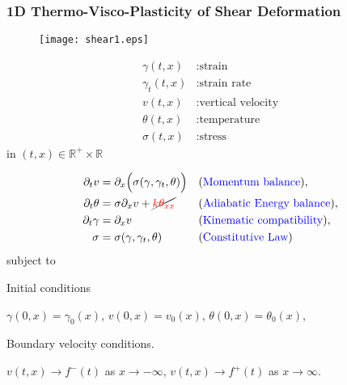 \documentclass{beamer}
\def\red{\color{red}}
\def\blue{\color{blue}}
\begin{document}
\begin{frame}
\frametitle{1D Thermo-Visco-Plasticity of Shear Deformation}
    \begin{minipage}{0.31\linewidth}
    \begin{figure}
    \centering
    \texttt{[image: shear1.eps]}
    \end{figure}
      {\scriptsize
    \begin{equation*} %
    \begin{aligned}
    \gamma(t,x) &: \text{strain}\\
    \gamma_t(t,x) &: \text{strain rate}\\
    v(t,x) &: \text{vertical velocity}\\
    \theta(t,x) &: \text{temperature}\\
    \sigma(t,x) &: \text{stress}
    \end{aligned}
    \end{equation*}
    in $(t,x)\in \mathbb{R}^+ \times \mathbb{R}$}
    \end{minipage}
    \begin{minipage}{0.61\linewidth}
      \begin{equation*} %
        \begin{aligned}
          \partial_t v &= \partial_x\Big(\sigma(\gamma,\gamma_t,\theta)\Big) & &\text{({\blue Momentum balance})}, \\
          \partial_t \theta &= \sigma\partial_x v + \cancel{\red k\theta_{xx}} & &\text{({\blue Adiabatic Energy balance})},\\
          \partial_t \gamma &= \partial_x v & &\text{({\blue Kinematic compatibility})},\\
          \sigma  &= \sigma(\gamma,\gamma_t,\theta) & &\text{({\blue Constitutive Law})}\\
        \end{aligned}
      \end{equation*}
       subject to %
      \vskip 5pt
      
      Initial conditions
      
      {\scriptsize $\gamma(0,x) = \gamma_0(x)$, $v(0,x) = v_0(x)$, $\theta(0,x) = \theta_0(x)$,} 
      
      Boundary velocity conditions.
      
      {\scriptsize $v(t,x) \rightarrow f^-(t)$ as $x \rightarrow -\infty$, $v(t,x) \rightarrow f^+(t)$ as $x \rightarrow \infty$.}
    \end{minipage}
\end{frame}
\end{document}

